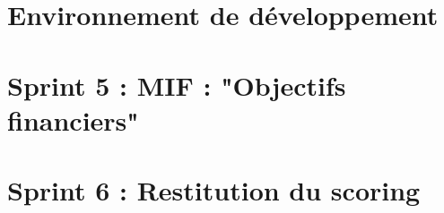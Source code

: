\section{Environnement de développement}
	
	
\section{Sprint 5 : MIF : "Objectifs financiers"}
	
	
\section{Sprint 6 : Restitution du scoring}
	